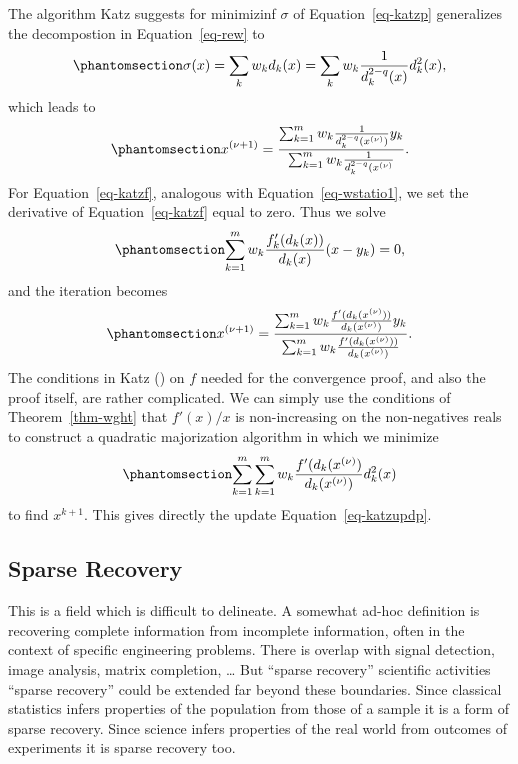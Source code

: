 \documentclass[
  12pt,
  letterpaper,
  DIV=11,
  numbers=noendperiod]{scrartcl}
\theoremstyle{definition}
\theoremstyle{plain}
\theoremstyle{plain}
\theoremstyle{plain}
\theoremstyle{definition}
\theoremstyle{remark}
\begin{document}
The algorithm Katz suggests for minimizinf \(\sigma\) of
Equation~\ref{eq-katzp} generalizes the decompostion in
Equation~\ref{eq-rew} to
\begin{equation}\phantomsection\label{eq-katzdec}{
\sigma(x)=\sum_k w_kd_k(x)=\sum_kw_k \frac{1}{d_k^{2-q}(x)}d_k^2(x),
}\end{equation} which leads to
\begin{equation}\phantomsection\label{eq-katzupdp}{
x^{(\nu+1)}=\frac{\sum_{k=1}^mw_k\frac{1}{d_k^{2-q}(x^{(\nu)})}y_k}{\sum_{k=1}^mw_k\frac{1}{d_k^{2-q}(x^{(\nu)}}}.
}\end{equation} For Equation~\ref{eq-katzf}, analogous with
Equation~\ref{eq-wstatio1}, we set the derivative of
Equation~\ref{eq-katzf} equal to zero. Thus we solve
\begin{equation}\phantomsection\label{eq-katzder}{
\sum_{k=1}^mw_k\frac{f_k'(d_k(x))}{d_k(x)}(x-y_k)=0,
}\end{equation} and the iteration becomes
\begin{equation}\phantomsection\label{eq-katzupdf}{
x^{(\nu+1)}=\frac{\sum_{k=1}^mw_k\frac{f'(d_k(x^{(\nu)}))}{d_k(x^{(\nu)})}y_k}{\sum_{k=1}^mw_k\frac{f'(d_k(x^{(\nu)}))}{d_k(x^{(\nu)})}}.
}\end{equation} The conditions in Katz () on
\(f\) needed for the convergence proof, and also the proof itself, are
rather complicated. We can simply use the conditions of
Theorem~\ref{thm-wght} that \(f'(x)/x\) is non-increasing on the
non-negatives reals to construct a quadratic majorization algorithm in
which we minimize \begin{equation}\phantomsection\label{eq-katzmajor}{
\sum_{k=1}^m\sum_{k=1}^mw_k\frac{f'(d_k(x^{(\nu)})}{d_k(x^{(\nu)})}d_k^2(x)
}\end{equation} to find \(x^{k+1}\). This gives directly the update
Equation~\ref{eq-katzupdp}.

\subsection{Sparse Recovery}\label{sparse-recovery}

This is a field which is difficult to delineate. A somewhat ad-hoc
definition is recovering complete information from incomplete
information, often in the context of specific engineering problems.
There is overlap with signal detection, image analysis, matrix
completion, \ldots{} But ``sparse recovery'' scientific activities
``sparse recovery'' could be extended far beyond these boundaries. Since
classical statistics infers properties of the population from those of a
sample it is a form of sparse recovery. Since science infers properties
of the real world from outcomes of experiments it is sparse recovery
too.
\end{document}
